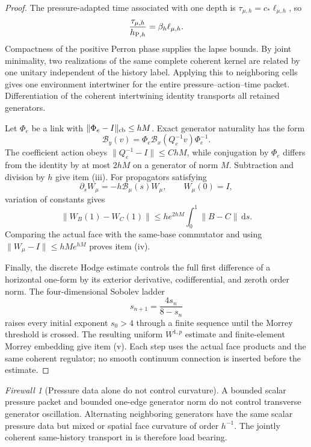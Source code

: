 \documentclass[11pt]{article}
\theoremstyle{definition}
\theoremstyle{remark}
\newtheorem{firewall}[theorem]{Firewall}
\newcommand{\dd}{\mathrm d}
\begin{document}
\begin{proof}
The pressure-adapted time associated with one depth is
\(\tau_{\mu,h}=c_*\ell_{\mu,h}\), so
\[
 \frac{\tau_{\mu,h}}{h_{{\rm P},h}}
 =\beta_h\ell_{\mu,h}.
\]
Compactness of the positive Perron phase supplies the lapse bounds.  By joint
minimality, two realizations of the same complete coherent kernel are related
by one unitary independent of the history label.  Applying this to neighboring
cells gives one environment intertwiner for the entire pressure--action--time
packet.  Differentiation of the coherent intertwining identity transports all
retained generators.

Let \(\Phi_e\) be a link with
\(\|\Phi_e-I\|_{\rm cb}\le hM\).  Exact generator naturality has the form
\[
 \mathcal B_y(v)
 =\Phi_e\mathcal B_x(Q_e^{-1}v)\Phi_e^{-1}.
\]
The coefficient action obeys \(\|Q_e^{-1}-I\|\le C hM\), while conjugation by
\(\Phi_e\) differs from the identity by at most \(2hM\) on a generator of
norm \(M\).  Subtraction and division by \(h\) give item \textup{(iii)}.
For propagators satisfying
\[
 \partial_sW_\mu=-h\mathcal B_\mu(s)W_\mu,
 \qquad W_\mu(0)=I,
\]
variation of constants gives
\[
 \|W_B(1)-W_C(1)\|
 \le h e^{2hM}\int_0^1\|B-C\|\,\dd s.
\]
Comparing the actual face with the same-base commutator and using
\(\|W_\mu-I\|\le hMe^{hM}\) proves item \textup{(iv)}.

Finally, the discrete Hodge estimate controls the full first difference of a
horizontal one-form by its exterior derivative, codifferential, and zeroth
order norm.  The four-dimensional Sobolev ladder
\[
 s_{n+1}=\frac{4s_n}{8-s_n}
\]
raises every initial exponent \(s_0>4\) through a finite sequence until the
Morrey threshold is crossed.  The resulting uniform \(W^{1,p}\) estimate and
finite-element Morrey embedding give item \textup{(v)}.  Each step uses the
actual face products and the same coherent regulator; no smooth continuum
connection is inserted before the estimate.
\end{proof}

\begin{firewall}[Pressure data alone do not control curvature]
A bounded scalar pressure packet and bounded one-edge generator norm do not
control transverse generator oscillation.  Alternating neighboring generators
have the same scalar pressure data but mixed or spatial face curvature of
order \(h^{-1}\).  The jointly coherent same-history transport in
 is therefore load bearing.
\end{firewall}
\end{document}

